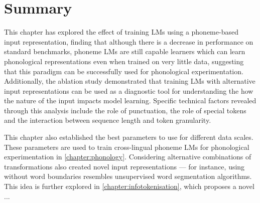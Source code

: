 \section{Summary}

This chapter has explored the effect of training LMs using a phoneme-based input representation, finding that although there is a decrease in performance on standard benchmarks, phoneme LMs are still capable learners which can learn phonological representations even when trained on very little data, suggesting that this paradigm can be successfully used for phonological experimentation. Additionally, the ablation study demonstrated that training LMs with alternative input representations can be used as a diagnostic tool for understanding the how the nature of the input impacts model learning. Specific technical factors revealed through this analysis include the role of punctuation, the role of special tokens and the interaction between sequence length and token granularity.


This chapter also established the best parameters to use for different data scales. These parameters are used to train cross-lingual phoneme LMs for phonological experimentation in \cref{chapter:phonology}. Considering alternative combinations of transformations also created novel input representations --- for instance, using \bpe without word boundaries resembles unsupervised word segmentation algorithms. This idea is further explored in \cref{chapter:infotokenisation}, which proposes a novel ...





